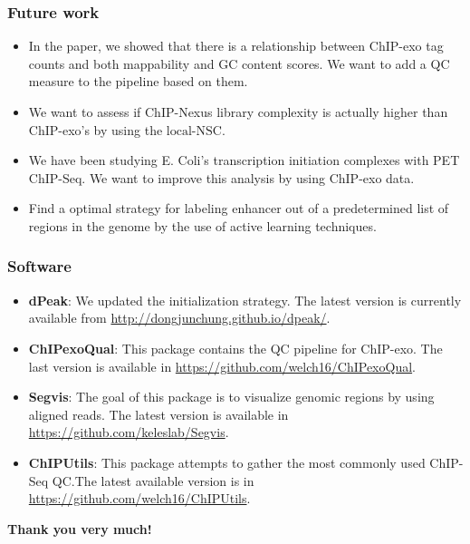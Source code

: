\documentclass[compress,table,xcolor=dvipsnames]{beamer}\usepackage[]{graphicx}\usepackage[]{color}
\begin{document}
\begin{frame}[label=future]
\frametitle{Future work}  

\begin{itemize}
\item In the paper, we showed that there is a relationship between
  ChIP-exo tag counts and both mappability and GC content scores. We
  want to add a QC measure to the pipeline based on
  them. \hyperlink{gcmap}{}
\item We want to assess if ChIP-Nexus library complexity is actually
  higher than ChIP-exo's by using the
  $\mbox{local-NSC}$. \hyperlink{nexus}{}

\item We have been studying E. Coli's transcription initiation
  complexes with PET ChIP-Seq. We want to improve this analysis by
  using ChIP-exo data.  \hyperlink{tic}{}
\item Find a optimal strategy for labeling enhancer out of a
  predetermined list of regions in the genome by the use of active
  learning techniques.
\end{itemize}

\end{frame}

\begin{frame}[t]
\frametitle{Software}  
\begin{itemize}
\item {\color{RoyalBlue}\textbf{dPeak}}: We updated the initialization
  strategy. The latest version is currently available from
  \url{http://dongjunchung.github.io/dpeak/}.
\item {\color{RoyalBlue}\textbf{ChIPexoQual}}: This package contains
  the QC pipeline for ChIP-exo. The last version is available in
  \url{https://github.com/welch16/ChIPexoQual}.
\item {\color{RoyalBlue}\textbf{Segvis}}: The goal of this package is
  to visualize genomic regions by using aligned reads. The latest
  version is available in \url{https://github.com/keleslab/Segvis}.
\item {\color{RoyalBlue}\textbf{ChIPUtils}}: This package attempts to
  gather the most commonly used ChIP-Seq QC.The latest available
  version is in \url{https://github.com/welch16/ChIPUtils}.
\end{itemize}

\end{frame}

\begin{frame}[plain]
  
{\Huge
{\color{RoyalBlue}
\begin{center}
  \textbf{Thank you very much!}
\end{center}
}
}


\end{frame}
\end{document}
